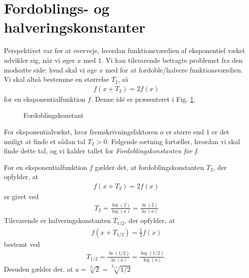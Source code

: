 \section*{Fordoblings- og halveringskonstanter}
Perspektivet var før at overveje, hvordan funktionsværdien af eksponentiel vækst udvikler sig, når vi øger $x$ med $1$. Vi kan tilsvarende betragte problemet fra den modsatte side: hvad skal vi øge $x$ med for at fordoble/halvere funktionsværdien. Vi skal altså bestemme en størrelse $T_2$, så 
\begin{align*}
f(x+T_2) = 2f(x)
\end{align*}
for en eksponentialfunktion $f$. Denne idé er præsenteret i Fig. \ref{fig:Fordobling}. 
\begin{figure}[H]
\center
{}
\caption{Fordoblingskonstant}
\label{fig:Fordobling}

\end{figure}
For eksponentialvækst, hvor fremskrivningsfaktoren $a$ er større end $1$ er det muligt at finde et sådan tal $T_2>0$. Følgende sætning fortæller, hvordan vi skal finde dette tal, og vi kalder tallet for \textit{Fordoblingskonstanten for f}.
\begin{setn}
For en eksponentialfunktion $f$ gælder det, at fordoblingskonstanten $T_2$, der opfylder, at
\begin{align*}
f(x+T_2) = 2f(x)
\end{align*}
er givet ved 
\begin{align*}
T_2 = \frac{\log(2)}{\log(a)} = \frac{\ln(2)}{\ln(a)}
\end{align*}
Tilsvarende er halveringskonstanten $T_{1/2}$, der opfylder, at 
\begin{align*}
f(x+T_{1/2}) = \frac{1}{2}f(x)
\end{align*}
bestemt ved
\begin{align*}
T_{1/2} = \frac{\ln(1/2)}{\ln(a)} = \frac{\log(1/2)}{\log(a)}.
\end{align*}
Desuden gælder der, at $a = \sqrt[T_2]{2}= \sqrt[T_{1/2}]{1/2}$
\end{setn}
